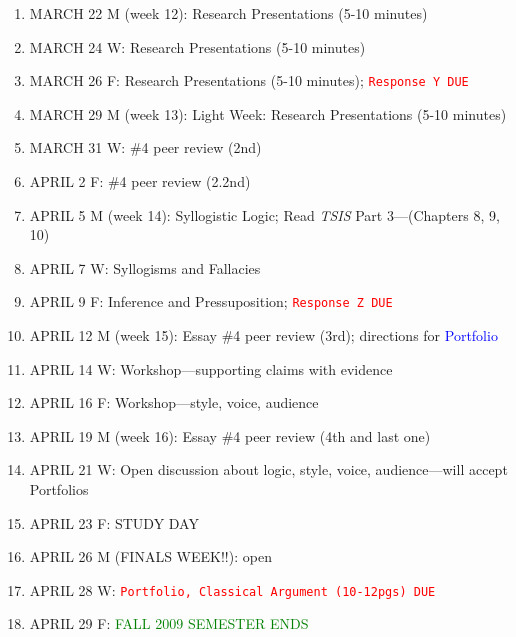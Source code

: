 \begin{enumerate}
\item MARCH 22 M (week 12): Research Presentations (5-10 minutes)
\item[] MARCH 24 W: Research Presentations (5-10 minutes)
\item[] MARCH 26 F: Research Presentations (5-10 minutes); \textcolor{red}{\texttt{Response Y DUE}}

\item MARCH 29 M (week 13): Light Week: Research Presentations (5-10 minutes)
\item[] MARCH 31 W: \#4 peer review (2nd)
\item[] APRIL 2 F: \#4 peer review (2.2nd)

\item APRIL 5 M (week 14): Syllogistic Logic; Read {\sl TSIS} Part 3---(Chapters 8, 9, 10)
\item[] APRIL 7 W: Syllogisms and Fallacies
\item[] APRIL 9 F: Inference and Pressuposition; \textcolor{red}{\texttt{Response Z DUE}}

\item APRIL 12 M (week 15): Essay \#4 peer review (3rd); directions for \textcolor{blue}{Portfolio}
\item[] APRIL 14 W: Workshop---supporting claims with evidence
\item[] APRIL 16 F: Workshop---style, voice, audience

\item APRIL 19 M (week 16): Essay \#4 peer review (4th and last one)
\item[] APRIL 21 W:  Open discussion about logic, style, voice, audience---will accept Portfolios
\item[] APRIL 23 F: STUDY DAY

\item APRIL 26 M (FINALS WEEK!!): open
\item[] APRIL 28 W: \textcolor{red}{\texttt{Portfolio, Classical Argument (10-12pgs) DUE}}
\item[] APRIL 29 F: \textcolor{green}{FALL 2009 SEMESTER ENDS}
\end{enumerate}

% 